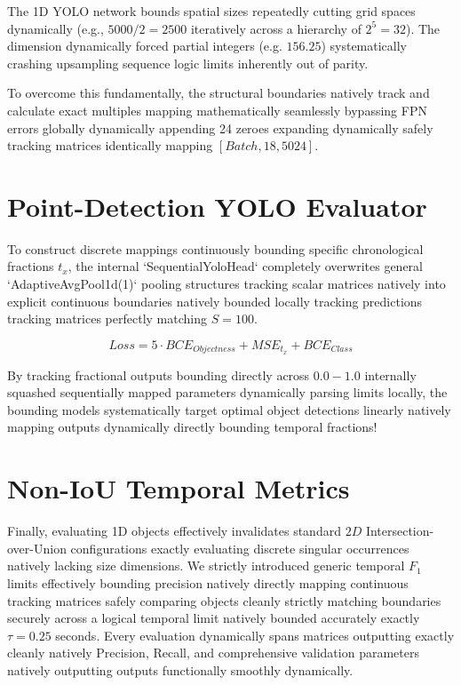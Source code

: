 \documentclass[conference]{IEEEtran}
\begin{document}
The 1D YOLO network bounds spatial sizes repeatedly cutting grid spaces dynamically (e.g., $5000/2=2500$ iteratively across a hierarchy of $2^5 = 32$). The dimension dynamically forced partial integers (e.g. $156.25$) systematically crashing upsampling sequence logic limits inherently out of parity. 

To overcome this fundamentally, the structural boundaries natively track and calculate exact multiples mapping mathematically seamlessly bypassing FPN errors globally dynamically appending 24 zeroes expanding dynamically safely tracking matrices identically mapping $[Batch, 18, 5024]$.

\section{Point-Detection YOLO Evaluator}
To construct discrete mappings continuously bounding specific chronological fractions $t_x$, the internal `SequentialYoloHead` completely overwrites general `AdaptiveAvgPool1d(1)` pooling structures tracking scalar matrices natively into explicit continuous boundaries natively bounded locally tracking predictions tracking matrices perfectly matching $S=100$.

\begin{equation}
    Loss = 5 \cdot BCE_{{Objectness}} + MSE_{{t_x}} + BCE_{{Class}}
\end{equation}

By tracking fractional outputs bounding directly across $0.0 - 1.0$ internally squashed sequentially mapped parameters dynamically parsing limits locally, the bounding models systematically target optimal object detections linearly natively mapping outputs dynamically directly bounding temporal fractions!

\section{Non-IoU Temporal Metrics}
Finally, evaluating 1D objects effectively invalidates standard $2D$ Intersection-over-Union configurations exactly evaluating discrete singular occurrences natively lacking size dimensions. We strictly introduced generic temporal $F_1$ limits effectively bounding precision natively directly mapping continuous tracking matrices safely comparing objects cleanly strictly matching boundaries securely across a logical temporal limit natively bounded accurately exactly $\tau = 0.25$ seconds. Every evaluation dynamically spans matrices outputting exactly cleanly natively Precision, Recall, and comprehensive validation parameters natively outputting outputs functionally smoothly dynamically.
\end{document}
